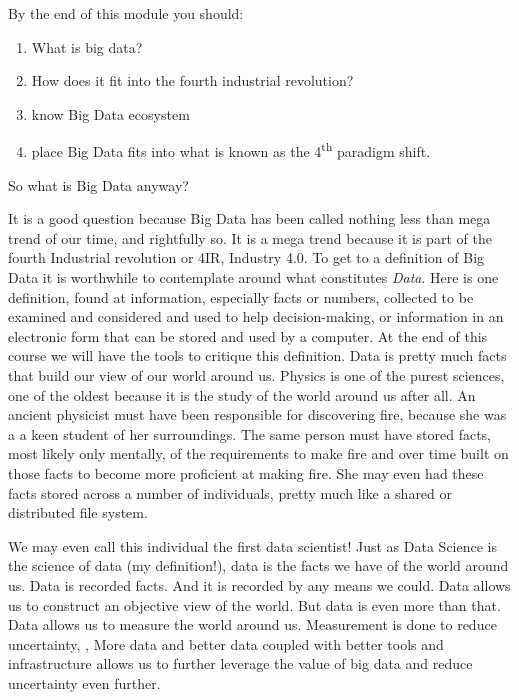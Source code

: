 By the end of this module you should:
\begin{enumerate}
	\item What is big data?
	\item How does it fit into the fourth industrial revolution?
	\item know Big Data ecosystem
	\item place Big Data fits into what is known as the 4\textsuperscript{th} paradigm shift.
\end{enumerate}
So what is Big Data anyway? \par
It is a good question because Big Data has been called nothing less than  mega trend of our time, \cite{Mar15} and rightfully so.  It is a mega trend because it is part of the fourth Industrial revolution or 4IR, Industry 4.0.  
To get to a definition of Big Data it is worthwhile to contemplate around what constitutes \textit{Data}.  Here is one definition, found at  \cite{Ach89}
information, especially facts or numbers, collected to be examined and considered and used to help decision-making, or information in an electronic form that can be stored and used by a computer.
At the end of this course we will have the tools to critique this definition. Data is pretty much facts that build our view of our world around us.  Physics is one of the purest sciences, one of the oldest because it is the study of the world around us after all.  An ancient physicist must have been responsible for discovering fire, because she was a a keen student of her surroundings.  The same person must have stored facts, most likely only mentally, of the requirements to make fire and over time built on those facts to become more proficient at making fire.  She may even had these facts stored across a number of individuals, pretty much like a shared or distributed file system. \par
We may even call this individual the first data scientist!  Just as Data Science is the science of data (my definition!), data is the facts we have of the world around us.  Data is recorded facts.  And it is recorded by any means we could.  Data allows us to construct an objective view of the world.  But data is even more than that.  Data allows us to measure the world around us.  Measurement is done to reduce uncertainty, \cite{hubbard2014measure}, \cite{ho2009experimental}   More data and better data coupled with better tools and infrastructure allows us to further leverage the value of big data and reduce uncertainty even further.  \par
